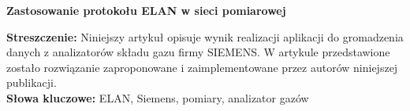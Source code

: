 \begin{center}
\textbf{Zastosowanie protokołu ELAN w sieci pomiarowej}
\end{center}
\textbf{Streszczenie: }
Niniejszy artykuł opisuje wynik realizacji aplikacji do gromadzenia danych z analizatorów składu gazu firmy SIEMENS.
W artykule przedstawione zostało rozwiązanie zaproponowane i zaimplementowane przez autorów niniejszej publikacji. \\
\textbf{Słowa kluczowe: } ELAN, Siemens, pomiary, analizator gazów